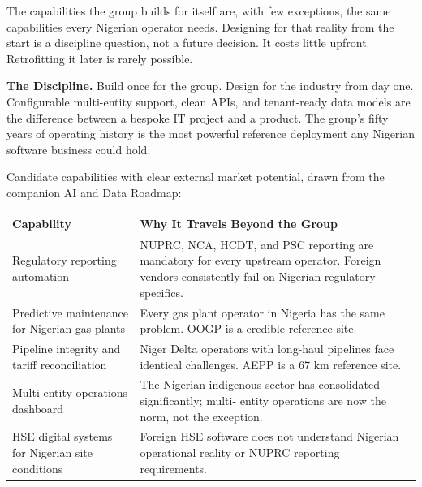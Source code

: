 \documentclass[10pt]{article}
\newcommand{\spacer}{\vspace{10pt}}
\begin{document}
The capabilities the group builds for itself are, with few exceptions, the
same capabilities every Nigerian operator needs. Designing for that reality
from the start is a discipline question, not a future decision. It costs
little upfront. Retrofitting it later is rarely possible.

\spacer

\noindent\colorbox{primary!8}{%
\begin{minipage}{\dimexpr\textwidth-2\fboxsep}
  \vspace{6pt}
  \textbf{\color{primary}The Discipline.}\quad
  Build once for the group. Design for the industry from day one. Configurable
  multi-entity support, clean APIs, and tenant-ready data models are the
  difference between a bespoke IT project and a product. The group's fifty
  years of operating history is the most powerful reference deployment any
  Nigerian software business could hold.
  \vspace{6pt}
\end{minipage}}

\spacer

Candidate capabilities with clear external market potential, drawn from the
companion AI and Data Roadmap:

\spacer
\small
\begin{tabularx}{\columnwidth}{@{}lX@{}}
\toprule
\textbf{Capability} & \textbf{Why It Travels Beyond the Group} \\
\midrule
Regulatory reporting automation
  & NUPRC, NCA, HCDT, and PSC reporting are mandatory for every upstream
    operator. Foreign vendors consistently fail on Nigerian regulatory
    specifics. \\
Predictive maintenance for Nigerian gas plants
  & Every gas plant operator in Nigeria has the same problem. OOGP is a
    credible reference site. \\
Pipeline integrity and tariff reconciliation
  & Niger Delta operators with long-haul pipelines face identical
    challenges. AEPP is a 67 km reference site. \\
Multi-entity operations dashboard
  & The Nigerian indigenous sector has consolidated significantly; multi-
    entity operations are now the norm, not the exception. \\
HSE digital systems for Nigerian site conditions
  & Foreign HSE software does not understand Nigerian operational reality
    or NUPRC reporting requirements. \\
\bottomrule
\end{tabularx}
\normalsize
\end{document}
